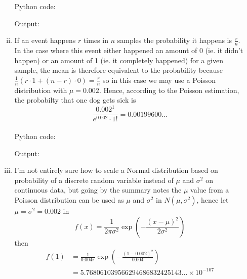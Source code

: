 \documentclass[10pt]{article}
\begin{document}
\begin{enumerate}
\begin{enumerate}[(i)]
                    Python code:
                    
                    Output:
                    
                \item If an event happens $r$ times in $n$ samples the
                    probability it happens is $\frac{r}{n}$. In the case where
                    this event either happened an amount of 0 (ie. it didn't
                    happen) or an amount of 1 (ie.  it completely happened) for
                    a given sample, the mean is therefore equivalent to the
                    probability because $\frac{1}{n}(r \cdot 1 + (n - r)\cdot
                    0) = \frac{r}{n}$ so in this case we may use a Poisson
                    distribution with $\mu = 0.002$. Hence, according to the
                    Poisson estimation, the probabilty that one dog gets sick
                    is
                    $$
                        \frac{0.002^1}{e^{0.002}\cdot1!} = 0.00199600 \dots
                    $$
                    \\

                    Python code:
                    
                    Output:
                    
                \item I'm not entirely sure how to scale a Normal distribution
                    based on probability of a discrete random variable instead
                    of $\mu$ and $\sigma^2$ on continuous data, but going by
                    the summary notes the $\mu$ value from a Poisson
                    distribution can be used as $\mu$ and $\sigma^2$ in
                    $N(\mu,\sigma^2)$, hence let $\mu = \sigma^2 = 0.002$ in
                    $$
                        f(x) = \frac{1}{2\pi\sigma^2}\exp\left(-\frac{(x - \mu)^2}{2\sigma^2}\right)
                    $$
                    then
                    \begin{align*}
                        f(1) &= \frac{1}{0.004\pi}\exp\left(-\frac{(1 - 0.002)^2}{0.004}\right)\\
                         &= 5.768061039566294686832425143 ... \times 10^{-107}
                    \end{align*}
                    \\


\end{enumerate}
\end{enumerate}
\end{document}

